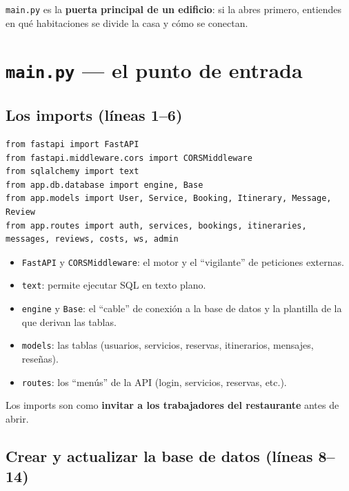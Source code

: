 \documentclass[11pt,a4paper]{article}
\begin{document}
\begin{analogia}
\texttt{main.py} es la \textbf{puerta principal de un edificio}: si la abres primero,
entiendes en qué habitaciones se divide la casa y cómo se conectan.
\end{analogia}

\section{\texttt{main.py} --- el punto de entrada}

\subsection{Los imports (líneas 1--6)}

\begin{lstlisting}
from fastapi import FastAPI
from fastapi.middleware.cors import CORSMiddleware
from sqlalchemy import text
from app.db.database import engine, Base
from app.models import User, Service, Booking, Itinerary, Message, Review
from app.routes import auth, services, bookings, itineraries, messages, reviews, costs, ws, admin
\end{lstlisting}

\begin{itemize}
    \item \texttt{FastAPI} y \texttt{CORSMiddleware}: el motor y el ``vigilante'' de peticiones externas.
    \item \texttt{text}: permite ejecutar SQL en texto plano.
    \item \texttt{engine} y \texttt{Base}: el ``cable'' de conexión a la base de datos y la
    plantilla de la que derivan las tablas.
    \item \texttt{models}: las tablas (usuarios, servicios, reservas, itinerarios, mensajes, reseñas).
    \item \texttt{routes}: los ``menús'' de la API (login, servicios, reservas, etc.).
\end{itemize}

\begin{analogia}
Los imports son como \textbf{invitar a los trabajadores del restaurante} antes de abrir.
\end{analogia}

\subsection{Crear y actualizar la base de datos (líneas 8--14)}
\end{document}
